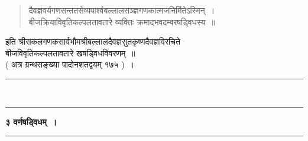 \documentclass[11pt, openany]{book}
\begin{document}
\begin{sloppypar}
\begin{quote}
{\color{violet}दैवज्ञवर्यगणसन्ततसेव्यपार्श्वबल्लालसञ्ज्ञगणकात्मजनिर्मितेऽस्मिन्~।\\
बीजक्रियाविवृतिकल्पलतावतारे व्यक्तिः क्रमादभवदम्बरषड्विधस्य~॥ }
\end{quote}
\vspace{-1mm}

\begin{center}
इति श्रीसकलगणकसार्वभौमश्रीबल्लालदैवज्ञसुतकृष्णदैवज्ञविरचिते\\
बीजविवृतिकल्पलतावतारे खषड्विधविवरणम्~॥\\
( अत्र ग्रन्थसङ्ख्या पादोनशतद्वयम् १७५ )~। \\
\vspace{6mm}

\rule{0.2\linewidth}{0.8pt}\\
\vspace{-4mm}

\rule{0.2\linewidth}{0.8pt}
\end{center}
\end{sloppypar}

\newpage
\thispagestyle{empty}

\begin{center}
\textbf{\large ३\; वर्णषड्विधम्~।}\\
\rule{0.2\linewidth}{0.8pt}
\end{center}
\end{document}
